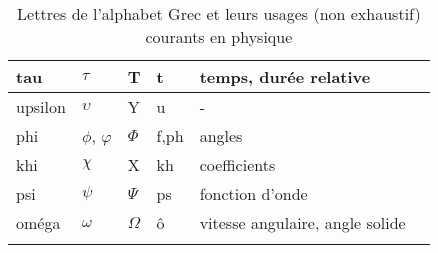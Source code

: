 \begin{table}[!h]
\begin{tabular}{M{1.75cm}M{1.75cm}M{1.75cm}M{3.75cm}M{3.75cm}N}
    \hline
    tau & $\tau$ & T & t & temps, durée relative  & \\[0.5em]
    \hline
    upsilon & $\upsilon$ & Y & u & -  & \\[0.5em]
    \hline
    phi & $\phi$, $\varphi$ & $\Phi$ & f,ph & angles   & \\[0.5em]
    \hline
    khi & $\chi$ & X  & kh & coefficients   & \\[0.5em]
    \hline
    psi & $\psi$ & $\Psi$ & ps & fonction d'onde   & \\[0.5em]
    \hline
    oméga & $\omega$ & $\Omega$ & ô & vitesse angulaire, angle solide   & \\[0.5em]
    \hhline{=====}
\end{tabular}
    \caption{Lettres de l'alphabet Grec et leurs usages (non exhaustif) courants en physique}
\end{table}

